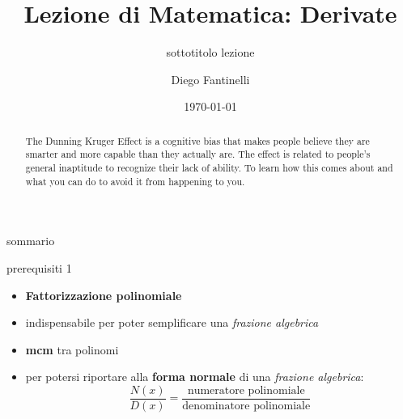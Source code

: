 \documentclass[aspectratio=169]{beamer}
\title{Lezione di Matematica: Derivate}
\subtitle{sottotitolo lezione}
\date{\today}
\author{Diego Fantinelli}
\institute{Matematica per il Liceo}
\begin{document}

\begin{frame}
	\titlepage
\end{frame}

\begin{frame}
    
    \begin{abstract}
        The Dunning Kruger Effect is a cognitive bias that makes people believe
        they are smarter and more capable than they actually are. The effect is
        related to people's general inaptitude to recognize their lack of
        ability. To learn how this comes about and what you can do to avoid it
        from happening to you.
    \end{abstract}
\end{frame}

\begin{frame}{sommario}
  \tableofcontents
\end{frame}








\begin{frame}{prerequisiti 1}
\begin{itemize}
\item
  \textbf{Fattorizzazione polinomiale}
\item
  indispensabile per poter semplificare una \emph{frazione algebrica}
\item
  \textbf{mcm} tra polinomi
\item
  per potersi riportare alla \textbf{forma normale} di una
  \emph{frazione algebrica}: \[\dfrac{N(x)}{D(x)} = \dfrac{\text{numeratore polinomiale}}{\text{denominatore polinomiale}}\]
\end{itemize}
\end{frame}
\end{document}

